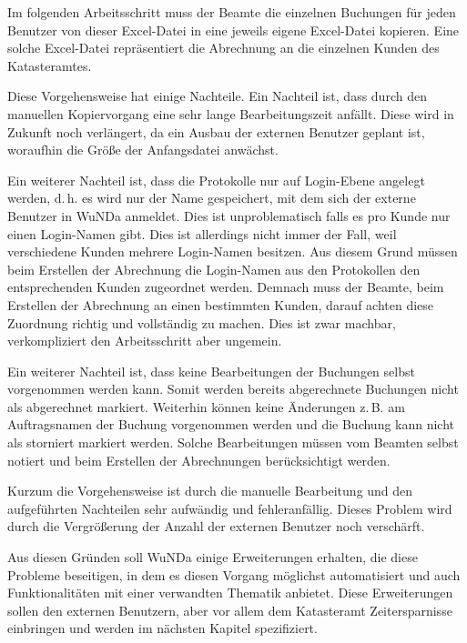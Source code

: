 Im folgenden Arbeitsschritt muss der Beamte die einzelnen Buchungen für jeden Benutzer von dieser Excel-Datei in eine jeweils eigene Excel-Datei kopieren. Eine solche Excel-Datei repräsentiert die Abrechnung an die einzelnen Kunden des Katasteramtes.

Diese Vorgehensweise hat einige Nachteile. Ein Nachteil ist, dass durch den manuellen Kopiervorgang eine sehr lange Bearbeitungszeit anfällt. Diese wird in Zukunft noch verlängert, da ein Ausbau der externen Benutzer geplant ist, woraufhin die Größe der Anfangsdatei anwächst.

Ein weiterer Nachteil ist, dass die Protokolle nur auf Login-Ebene angelegt werden, d.\,h. es wird nur der Name gespeichert, mit dem sich der externe Benutzer in \ac{WuNDa} anmeldet.
Dies ist unproblematisch falls es pro Kunde nur einen Login-Namen gibt.
Dies ist allerdings nicht immer der Fall, weil verschiedene Kunden mehrere Login-Namen besitzen.
Aus diesem Grund müssen beim Erstellen der Abrechnung die Login-Namen aus den Protokollen den entsprechenden Kunden zugeordnet werden.
Demnach muss der Beamte, beim Erstellen der Abrechnung an einen bestimmten Kunden, darauf achten diese Zuordnung richtig und vollständig zu machen.
Dies ist zwar machbar, verkompliziert den Arbeitsschritt aber ungemein.

\label{subsec:erstellen_abrechnung_storno}
Ein weiterer Nachteil ist, dass keine Bearbeitungen der Buchungen selbst vorgenommen werden kann.
Somit werden bereits abgerechnete Buchungen nicht als abgerechnet markiert.
Weiterhin können keine Änderungen z.\,B. am Auftragsnamen der Buchung vorgenommen werden und die Buchung kann nicht als storniert markiert werden.
Solche Bearbeitungen müssen vom Beamten selbst notiert und beim Erstellen der Abrechnungen berücksichtigt werden.

Kurzum die Vorgehensweise ist durch die manuelle Bearbeitung und den aufgeführten Nachteilen sehr aufwändig und fehleranfällig. Dieses Problem wird durch die Vergrößerung der Anzahl der externen Benutzer noch verschärft.

Aus diesen Gründen soll \ac{WuNDa} einige Erweiterungen erhalten, die diese Probleme beseitigen, in dem es diesen Vorgang möglichst automatisiert und auch Funktionalitäten mit einer verwandten Thematik anbietet. Diese Erweiterungen sollen den externen Benutzern, aber vor allem dem Katasteramt Zeitersparnisse einbringen und werden im nächsten Kapitel spezifiziert.


